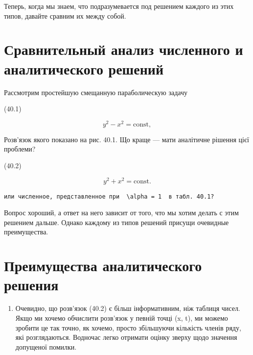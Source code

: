 \documentclass[
  ukrainian,
]{article}
\providecommand{\tightlist}{%
  \setlength{\itemsep}{0pt}\setlength{\parskip}{0pt}}
\begin{document}
Теперь, когда мы знаем, что подразумевается под решением каждого из этих
типов, давайте сравним их между собой.

\section{\texorpdfstring{\textbf{Сравнительный анализ численного} и
аналитического
решений}{Сравнительный анализ численного и аналитического решений}}\label{ux441ux440ux430ux432ux43dux438ux442ux435ux43bux44cux43dux44bux439-ux430ux43dux430ux43bux438ux437-ux447ux438ux441ux43bux435ux43dux43dux43eux433ux43e-ux438-ux430ux43dux430ux43bux438ux442ux438ux447ux435ux441ux43aux43eux433ux43e-ux440ux435ux448ux435ux43dux438ux439}

Рассмотрим простейшую смещанную параболическую задачу

(40.1)

\[
y^2 - x^2 = \text{const},
\]

Розв'язок якого показано на рис. 40.1. Що краще --- мати аналітичне
рішення цієї проблеми?

(40.2)

\[
y^2 + x^2 = \text{const}.
\]

\begin{verbatim}
или численное, представленное при  \alpha = 1  в табл. 40.1?
\end{verbatim}

Вопрос хороший, а ответ на него зависит от того, что мы хотим делать с
этим решением дальше. Однако каждому из типов решений присущи очевидные
преимущества.

\section{Преимущества аналитического
решения}\label{ux43fux440ux435ux438ux43cux443ux449ux435ux441ux442ux432ux430-ux430ux43dux430ux43bux438ux442ux438ux447ux435ux441ux43aux43eux433ux43e-ux440ux435ux448ux435ux43dux438ux44f}

\begin{enumerate}
\def\labelenumi{\arabic{enumi}.}
\tightlist
\item
  Очевидно, що розв'язок (40.2) є більш інформативним, ніж таблиця
  чисел. Якщо ми хочемо обчислити розв'язок у певній точці (x, t), ми
  можемо зробити це так точно, як хочемо, просто збільшуючи кількість
  членів ряду, які розглядаються. Водночас легко отримати оцінку зверху
  щодо значення допущеної помилки.
\end{enumerate}
\end{document}
